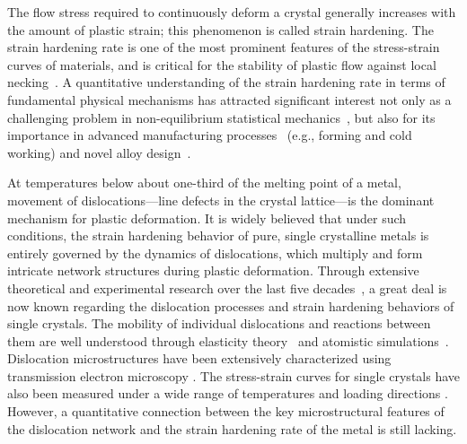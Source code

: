 \documentclass[%
reprint,
 amsmath,amssymb,
 aps,
superscriptaddress,
]{revtex4-1}
\begin{document}
\maketitle




The flow stress required to continuously deform a crystal generally increases
with the amount of plastic strain; this phenomenon is called strain hardening.
The strain hardening rate is one of the most prominent features of the
stress-strain curves of materials, and is critical for the stability of plastic
flow against local necking~\cite{Ghosh1977}. 
%
A quantitative understanding of the strain hardening rate in terms of
fundamental physical mechanisms has attracted significant interest not only as a
challenging problem in non-equilibrium statistical
mechanics~\cite{Friedel1955,Seeger1957,Nabarro1964,Mecking1981,Kocks2003,Bulatov2006,Devincre2008},
but also for its importance in advanced manufacturing
processes~\cite{Hosford2011B} (e.g., forming and cold working) and novel alloy
design~\cite{Tien1976B}.

At temperatures below about one-third of the melting point of a metal, 
movement of dislocations---line defects in the crystal lattice---is the
dominant mechanism for plastic deformation. 
%
It is widely believed that under such conditions, the strain hardening behavior
of pure, single crystalline metals is entirely governed by the dynamics of 
dislocations, which multiply and form intricate network structures during 
plastic deformation.
%
Through extensive theoretical and experimental research over the last five
decades~\cite{AHL2017},
%
%
a great deal is now known regarding the dislocation processes and strain
hardening behaviors of single crystals. The mobility of individual dislocations
and reactions between them are well understood through elasticity
theory~\cite{Shenoy2000,Madec2002,Madec2003,Kubin2003,Devincre2006,Bulatov2006}
and atomistic
simulations~\cite{Rodney1999,Bulatov2002,Olmsted2004b,Weinberger2011}.
%
Dislocation microstructures have been extensively characterized using
transmission electron microscopy \cite{Basinski1979,Hansen1995,Hong2013}. The
stress-strain curves for single crystals have also been measured under a wide
range of temperatures and loading directions \cite{Honeycombe1984B}.
%
However, a quantitative connection between the key microstructural features of
the dislocation network and the strain hardening rate of the metal is still
lacking.
\end{document}
